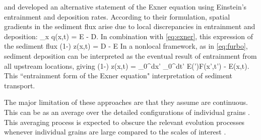 \citet{Nakagawa1976} and \citet{Tsujimoto1978} developed an alternative statement of the Exner equation using Einstein's entrainment and deposition rates.
According to their formulation, spatial gradients in the sediment flux arise due to local discrepancies in entrainment and deposition\DIFdelbegin {}\DIFdelend :
\be \partial_x q(x,t) = E - D. \ee 
In combination with \DIFdelbegin {}\DIFdelend \DIFaddbegin {}\DIFaddend \ref{eq:exner}, this expression of the sediment flux \DIFdelbegin {}\DIFdelend \DIFaddbegin {}\DIFaddend \be (1-\phi) \px z(x,t) = D - E\DIFdelbegin {}\DIFdelend \ee
\DIFaddbegin {}\DIFaddend In a nonlocal framework, as in \DIFdelbegin {}\DIFdelend \DIFaddbegin {}\DIFaddend \ref{eq:furbo}, sediment deposition can be interpreted as the eventual result of entrainment from all upstream locations, giving
\be (1-\phi) \px z(x,t) = \int_0^\infty dx' \int_0^\infty dt' E(\DIFdelbegin {}\DIFdelend \DIFaddbegin {}\DIFaddend ')F(x',t') - E(x,t). \ee
This ``entrainment form of the Exner equation" \DIFdelbegin {}\DIFdelend \DIFaddbegin {}\DIFaddend interpretation of sediment transport.

The major limitation of these approaches are that they assume \DIFdelbegin {}\DIFdelend \DIFaddbegin {}\DIFaddend are continuous. This can be \DIFdelbegin {}\DIFdelend \DIFaddbegin {}\DIFaddend as an average over the detailed \DIFaddbegin {}\DIFaddend configurations of individual \DIFaddbegin {}\DIFaddend grains \citep{Coleman2009}. This averaging process is expected to obscure the relevant \DIFdelbegin {}\DIFdelend \DIFaddbegin {}\DIFaddend evolution processes whenever individual grains are large compared to the scales of interest \citep[e.g.][]{Shobe2021}.

